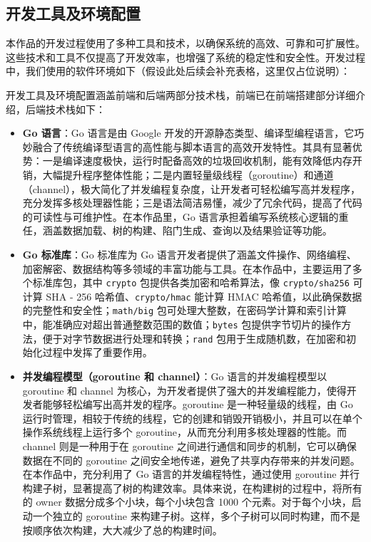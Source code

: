 \documentclass{cumcmthesis}
\numberwithin{equation}{section} %
\numberwithin{figure}{section} %
\numberwithin{table}{section} %
\begin{document}
\subsection{开发工具及环境配置}
本作品的开发过程使用了多种工具和技术，以确保系统的高效、可靠和可扩展性。这些技术和工具不仅提高了开发效率，也增强了系统的稳定性和安全性。开发过程中，我们使用的软件环境如下（假设此处后续会补充表格，这里仅占位说明）：

开发工具及环境配置涵盖前端和后端两部分技术栈，前端已在前端搭建部分详细介绍，后端技术栈如下：
\begin{itemize}
    \item \textbf{Go 语言}：Go 语言是由 Google 开发的开源静态类型、编译型编程语言，它巧妙融合了传统编译型语言的高性能与脚本语言的高效开发特性。其具有显著优势：一是编译速度极快，运行时配备高效的垃圾回收机制，能有效降低内存开销，大幅提升程序整体性能；二是内置轻量级线程（goroutine）和通道（channel），极大简化了并发编程复杂度，让开发者可轻松编写高并发程序，充分发挥多核处理器性能；三是语法简洁易懂，减少了冗余代码，提高了代码的可读性与可维护性。在本作品里，Go 语言承担着编写系统核心逻辑的重任，涵盖数据加载、树的构建、陷门生成、查询以及结果验证等功能。
    \item \textbf{Go 标准库}：Go 标准库为 Go 语言开发者提供了涵盖文件操作、网络编程、加密解密、数据结构等多领域的丰富功能与工具。在本作品中，主要运用了多个标准库包，其中 \texttt{crypto} 包提供各类加密和哈希算法，像 \texttt{crypto/sha256} 可计算 SHA - 256 哈希值、\texttt{crypto/hmac} 能计算 HMAC 哈希值，以此确保数据的完整性和安全性；\texttt{math/big} 包可处理大整数，在密码学计算和索引计算中，能准确应对超出普通整数范围的数值；\texttt{bytes} 包提供字节切片的操作方法，便于对字节数据进行处理和转换；\texttt{rand} 包用于生成随机数，在加密和初始化过程中发挥了重要作用。
    \item \textbf{并发编程模型（goroutine 和 channel）}：Go 语言的并发编程模型以 goroutine 和 channel 为核心，为开发者提供了强大的并发编程能力，使得开发者能够轻松编写出高并发的程序。goroutine 是一种轻量级的线程，由 Go 运行时管理，相较于传统的线程，它的创建和销毁开销极小，并且可以在单个操作系统线程上运行多个 goroutine，从而充分利用多核处理器的性能。而 channel 则是一种用于在 goroutine 之间进行通信和同步的机制，它可以确保数据在不同的 goroutine 之间安全地传递，避免了共享内存带来的并发问题。
    在本作品中，充分利用了 Go 语言的并发编程特性，通过使用 goroutine 并行构建子树，显著提高了树的构建效率。具体来说，在构建树的过程中，将所有的 owner 数据分成多个小块，每个小块包含 1000 个元素。对于每个小块，启动一个独立的 goroutine 来构建子树。这样，多个子树可以同时构建，而不是按顺序依次构建，大大减少了总的构建时间。

\end{itemize}
\end{document}

